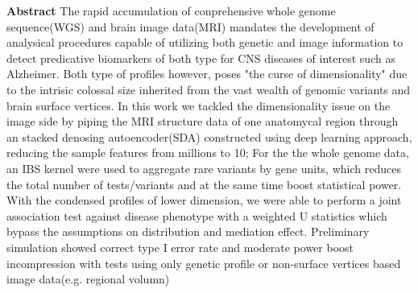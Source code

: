\documentclass{article}
\begin{document}
\textbf{Abstract}
The rapid accumulation of conprehensive whole genome sequence(WGS) and brain image data(MRI) mandates the development of analysical procedures capable of utilizing both genetic and image information to detect predicative biomarkers of both type for CNS diseases of interest such as Alzheimer. Both type of profiles however, poses "the curse of dimensionality" due to the intrisic colossal size inherited from the vast wealth of genomic variants and brain surface vertices. In this work we tackled the dimensionality issue on the image side by piping the MRI structure data of one anatomycal region through an stacked denosing autoencoder(SDA) constructed using deep learning approach, reducing the sample features from millions to 10; For the the whole genome data, an IBS kernel were used to aggregate rare variants by gene units, which reduces the total number of tests/variants and at the same time boost statistical power. With the condensed profiles of lower dimension, we were able to perform a joint association test against disease phenotype with a weighted U statistics which bypass the assumptions on distribution and mediation effect. Preliminary simulation showed correct type I error rate and moderate power boost incompression with tests using only genetic profile or non-surface vertices based image data(e.g. regional volumn)
\end{document}
